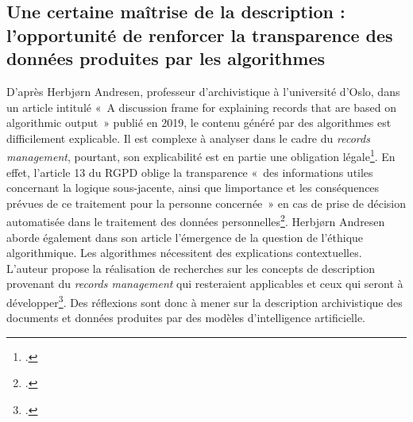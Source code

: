\subsection{Une certaine maîtrise de la description : l'opportunité de renforcer la transparence des données produites par les algorithmes}
	
	D'après Herbjørn Andresen, professeur d'archivistique à l'université
	d'Oslo, dans un article intitulé «~A discussion frame for explaining
	records that are based on algorithmic output~» publié en 2019, le
	contenu généré par des algorithmes est difficilement explicable. Il est
	complexe à analyser dans le cadre du \emph{records management},
	pourtant, son explicabilité est en partie une obligation
	légale\footcite{andresen_discussion_2019}. En effet, l'article 13 du
	RGPD oblige la transparence «~des informations utiles concernant la
	logique sous-jacente, ainsi que l\textquotesingle importance et les
	conséquences prévues de ce traitement pour la personne concernée~» en
	cas de prise de décision automatisée dans le traitement des données
	personnelles\footcite{noauthor_reglement_nodate}.
	Herbjørn Andresen aborde également dans son article l'émergence de la
	question de l'éthique algorithmique. Les algorithmes nécessitent des
	explications contextuelles. L'auteur propose la réalisation de
	recherches sur les concepts de description provenant du \emph{records
		management} qui resteraient applicables et ceux qui seront à
	développer\footcite{andresen_discussion_2019}. Des réflexions sont donc à mener sur la description
	archivistique des documents et données produites par des modèles
	d'intelligence artificielle.\newline
	
